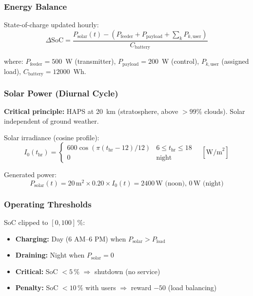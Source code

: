 \documentclass[conference]{IEEEtran}
\begin{document}
\subsubsection{Energy Balance}

State-of-charge updated hourly:
\begin{equation}
\Delta \text{SoC} = \frac{P_{\text{solar}}(t) - (P_{\text{feeder}} + P_{\text{payload}} + \sum_k P_{k,\text{user}})}{C_{\text{battery}}}
\label{eq:battery-balance}
\end{equation}

where: $P_{\text{feeder}} = 500$~W (transmitter), $P_{\text{payload}} = 200$~W (control), $P_{k,\text{user}}$ (assigned load), $C_{\text{battery}} = 12000$~Wh.

\subsubsection{Solar Power (Diurnal Cycle)}

\textbf{Critical principle:} HAPS at 20~km (stratosphere, above $>99\%$ clouds). Solar independent of ground weather.

\noindent Solar irradiance (cosine profile):
\begin{equation}
I_0(t_{\text{hr}}) = \begin{cases}
600 \cos(\pi(t_{\text{hr}} - 12)/12) & 6 \le t_{\text{hr}} \le 18 \\
0 & \text{night}
\end{cases} \quad [\text{W/m}^2]
\end{equation}

\noindent Generated power:
\begin{equation}
P_{\text{solar}}(t) = 20\,\text{m}^2 \times 0.20 \times I_0(t) = 2400\,\text{W (noon)}, \, 0\,\text{W (night)}
\end{equation}

\subsubsection{Operating Thresholds}

SoC clipped to $[0, 100]\,\%$:
\begin{itemize}\setlength{\itemsep}{2pt}
  \item \textbf{Charging:} Day (6 AM--6 PM) when $P_{\text{solar}} > P_{\text{load}}$
  \item \textbf{Draining:} Night when $P_{\text{solar}} = 0$
  \item \textbf{Critical:} SoC $< 5\,\%$ $\Rightarrow$ shutdown (no service)
  \item \textbf{Penalty:} SoC $< 10\,\%$ with users $\Rightarrow$ reward $-50$ (load balancing)
\end{itemize}
\end{document}
